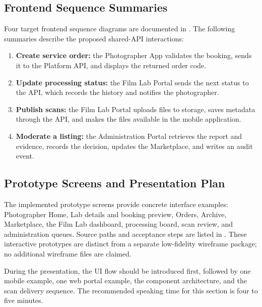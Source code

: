 \subsection{Frontend Sequence Summaries}

Four target frontend sequence diagrams are documented in .
The following summaries describe the proposed shared-API interactions:

\begin{enumerate}
    \item \textbf{Create service order:} the Photographer App validates the
    booking, sends it to the Platform API, and displays the returned order code.
    \item \textbf{Update processing status:} the Film Lab Portal sends the next
    status to the API, which records the history and notifies the photographer.
    \item \textbf{Publish scans:} the Film Lab Portal uploads files to storage,
    saves metadata through the API, and makes the files available in the mobile
    application.
    \item \textbf{Moderate a listing:} the Administration Portal retrieves the
    report and evidence, records the decision, updates the Marketplace, and
    writes an audit event.
\end{enumerate}

\subsection{Prototype Screens and Presentation Plan}

The implemented prototype screens provide concrete interface examples: Photographer
Home, Lab details and booking preview, Orders, Archive, Marketplace, the Film Lab
dashboard, processing board, scan review, and administration queues. Source paths
and acceptance steps are listed in .
These interactive prototypes are distinct from a separate low-fidelity wireframe
package; no additional wireframe files are claimed.

During the presentation, the UI flow should be introduced first, followed by
one mobile example, one web portal example, the component architecture, and the
scan delivery sequence. The recommended speaking time for this section is four
to five minutes.
